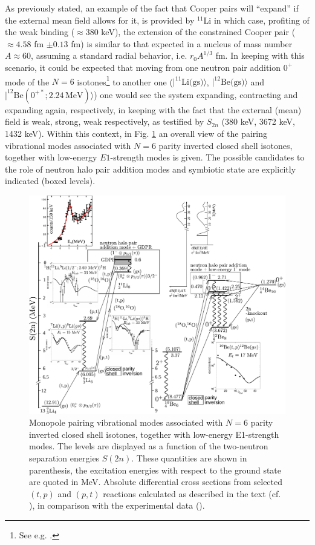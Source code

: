 As previously stated, an example of the fact that Cooper pairs will ``expand'' if the external mean field allows for it, is provided by $^{11}$Li in which case, profiting of the weak binding ($\approx 380$ keV), the extension of the constrained Cooper  pair ($\approx 4.58 $ fm $\pm 0.13$ fm)   is similar to that expected in a nucleus of mass number $A\approx 60$, assuming a standard radial behavior, i.e. $r_0 A^{1/3}$ fm. In keeping with this scenario, it could be expected that moving from one neutron pair addition $0^+$ mode of the $N=6$ isotones\footnote{See e.g. \cite{Gori:04}.} to another one ($|^{11}\text{Li(gs)}\rangle$, $|^{12}\text{Be(gs)}\rangle$ and $|^{12}\text{Be}(0^{+*};2.24\,\text{MeV})\rangle$) one would see the system expanding, contracting and expanding again, respectively, in keeping with the fact that the external (mean) field is weak, strong, weak respectively, as testified by $S_{2n}$ (380 keV, 3672 keV, 1432 keV).  
Within this context, in Fig. \ref{fig3.8.1} an overall view of the pairing vibrational modes associated with $N=6$ parity inverted closed shell isotones, together with low-energy $E1$-strength modes is given. The possible candidates to the role of neutron halo pair addition modes and symbiotic state are explicitly indicated (boxed levels).
\begin{figure}
	\centerline{\includegraphics*[width=21cm,angle=90]{nutshell/figs/fig3_8_1_v3}}
	\caption{Monopole pairing vibrational modes associated with 
		$N=6$ parity inverted closed shell isotones, together with low-energy E1-strength modes. 
		The levels are  displayed as a function of the two-neutron separation energies $S(2n)$. 
		These quantities are shown in parenthesis, the excitation energies with respect to the ground state are quoted in MeV. 
		Absolute differential cross sections from selected $(t,p)$ and $(p,t)$ reactions calculated as described in the text (cf. \cite{Potel:10,Potel:14}), 
		in comparison with the experimental data (\cite{Young:71,Fortune:94}).}\label{fig3.8.1}
\end{figure}


